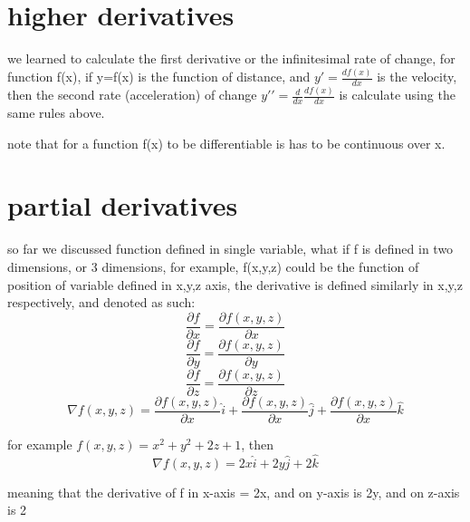 \documentclass[4apaper,12pt]{book}
\begin{document}
  \section{higher derivatives}
  \begin{description}
  \item we learned to calculate the first derivative or the infinitesimal rate of change, for function f(x), if y=f(x) is the function of distance, and $y\prime=\frac{df(x)}{dx}$ is the velocity, then the second rate (acceleration) of change $y\prime\prime=\frac{d}{dx}\frac{df(x)}{dx}$ is calculate using the same rules above.
  \item note that for a function f(x) to be differentiable is has to be continuous over x.
  \end{description}
  \section{partial derivatives}
  \begin{description}
  \item so far we discussed function defined in single variable, what if f is defined in two dimensions, or 3 dimensions, for example, f(x,y,z) could be the function of position of variable defined in x,y,z axis, the derivative is defined similarly in x,y,z respectively, and denoted as such:
    \begin{equation} \frac{\partial{f}}{\partial{x}} = \frac{\partial{f(x,y,z)}}{\partial{x}} \end{equation}
    \begin{equation} \frac{\partial{f}}{\partial{y}} = \frac{\partial{f(x,y,z)}}{\partial{y}} \end{equation}
    \begin{equation} \frac{\partial{f}}{\partial{z}} = \frac{\partial{f(x,y,z)}}{\partial{z}} \end{equation}
    \begin{equation} \nabla{f(x,y,z)} = \frac{\partial{f(x,y,z)}}{\partial{x}}\hat{i} +\frac{\partial{f(x,y,z)}}{\partial{x}}\hat{j} + \frac{\partial{f(x,y,z)}}{\partial{x}}\hat{k} \end{equation}
  \item for example $f(x,y,z) = x^2 + y^2 + 2z + 1$, then
    \begin{equation} \nabla{f(x,y,z)} = 2x\hat{i} + 2y\hat{j} + 2\hat{k} \end{equation}
  \item meaning that the derivative of f in x-axis = 2x, and on y-axis is 2y, and on z-axis is 2

  \end{description}
\end{document}

